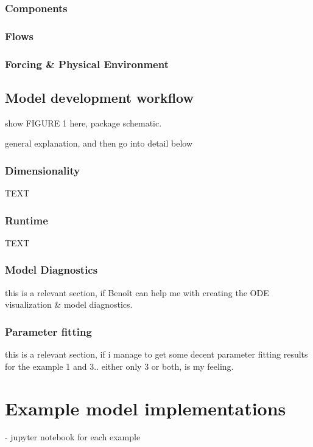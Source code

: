 \documentclass[journal abbreviations, manuscript]{copernicus}
\begin{document}
\subsubsection{Components}
\subsubsection{Flows}
\subsubsection{Forcing & Physical Environment}

\subsection{Model development workflow}
show FIGURE 1 here, package schematic.

general explanation, and then go into detail below

\subsubsection{Dimensionality}
TEXT

\subsubsection{Runtime}
TEXT

\subsubsection{Model Diagnostics}
this is a relevant section, if Benoît can help me with creating the ODE visualization & model diagnostics.

\subsubsection{Parameter fitting}
this is a relevant section, if i manage to get some decent parameter fitting results for the example 1 and 3.. either only 3 or both, is my feeling. 








\section{Example model implementations}
- jupyter notebook for each example
\end{document}
